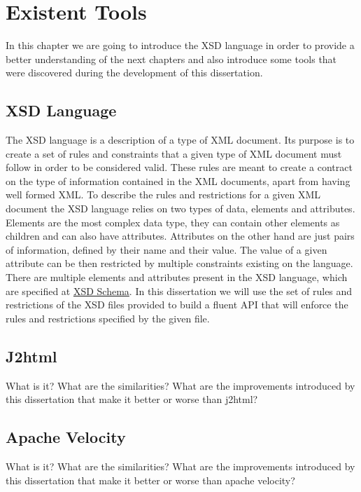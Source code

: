 \chapter{Existent Tools}
\label{cha:tools}

In this chapter we are going to introduce the \ac{XSD} language in order to provide a better understanding of the next chapters and also introduce some tools that were discovered during the development of this dissertation. 

\section{XSD Language} %
\label{sec:xsd}

The \ac{XSD} language is a description of a type of \ac{XML} document. Its purpose is to create a set of rules and constraints that a given type of \ac{XML} document must follow in order to be considered valid. These rules are meant to create a contract on the type of information contained in the \ac{XML} documents, apart from having well formed \ac{XML}. To describe the rules and restrictions for a given \ac{XML} document the \ac{XSD} language relies on two types of data, elements and attributes. Elements are the most complex data type, they can contain other elements as children and can also have attributes. Attributes on the other hand are just pairs of information, defined by their name and their value. The value of a given attribute can be then restricted by multiple constraints existing on the language. There are multiple elements and attributes present in the \ac{XSD} language, which are specified at \href{http://www.datypic.com/sc/xsd/s-xmlschema.xsd.html}{XSD Schema}. In this dissertation we will use the set of rules and restrictions of the \ac{XSD} files provided to build a fluent \ac{API} that will enforce the rules and restrictions specified by the given file.

\section{J2html} %
\label{sec:j2html}

What is it? What are the similarities? What are the improvements introduced by this dissertation that make it better or worse than j2html?

\section{Apache Velocity} %
\label{sec:apachevelocity}

What is it? What are the similarities? What are the improvements introduced by this dissertation that make it better or worse than apache velocity?
